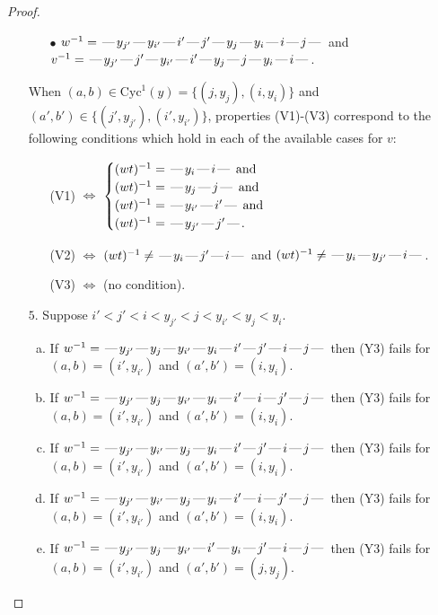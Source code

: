 \documentclass[10pt]{article}
\theoremstyle{definition}
\theoremstyle{definition}
\def\dash{\text{\hspace{0.5mm}---\hspace{0.5mm}}}
\def\Cyc{\mathrm{Cyc}}
\begin{document}
\begin{proof}
\begin{enumerate}
\begin{enumerate}
\item[$\bullet$] $w^{-1} = \dash y_{j'}\dash y_{i'}\dash i'\dash j'\dash y_j\dash y_i\dash i\dash j\dash $ and $v^{-1} = \dash y_{j'}\dash j'\dash y_{i'}\dash i'\dash y_j\dash j\dash y_i\dash i\dash $.
\end{enumerate}
When $(a,b)\in\Cyc^1(y)=\{(j,y_j),(i,y_i)\}$ and $(a',b')\in\{(j',y_{j'}),(i',y_{i'})\}$,
properties (V1)-(V3) correspond to the following conditions which hold in
each of the available cases for $v$:
\begin{enumerate}
\item[](V1) $\Leftrightarrow$ $\begin{cases}\text{$(wt)^{-1} = \dash y_i \dash i \dash$}\text{ and }\\
\text{$(wt)^{-1} = \dash y_j \dash j \dash$}\text{ and }\\
\text{$(wt)^{-1} = \dash y_{i'} \dash i' \dash$}\text{ and }\\
\text{$(wt)^{-1} = \dash y_{j'} \dash j' \dash$}.\end{cases}$
\item[](V2) $\Leftrightarrow$ $(wt)^{-1} \neq \dash y_i \dash j' \dash i \dash$ and $(wt)^{-1}\neq \dash y_i \dash y_{j'} \dash i \dash$.
\item[](V3) $\Leftrightarrow$ (no condition).
\end{enumerate}
\item[$5$.] Suppose $i' < j' < i < y_{j'} < j < y_{i'} < y_j < y_i$.
\begin{enumerate}[(a)]
\item If $w^{-1} = \dash y_{j'}\dash y_j\dash y_{i'}\dash y_i\dash i'\dash j'\dash i\dash j\dash $ then (Y3) fails for $(a,b)=(i',y_{i'})$ and $(a',b')=(i,y_i)$.
\item If $w^{-1} = \dash y_{j'}\dash y_j\dash y_{i'}\dash y_i\dash i'\dash i\dash j'\dash j\dash $ then (Y3) fails for $(a,b)=(i',y_{i'})$ and $(a',b')=(i,y_i)$.
\item If $w^{-1} = \dash y_{j'}\dash y_{i'}\dash y_j\dash y_i\dash i'\dash j'\dash i\dash j\dash $ then (Y3) fails for $(a,b)=(i',y_{i'})$ and $(a',b')=(i,y_i)$.
\item If $w^{-1} = \dash y_{j'}\dash y_{i'}\dash y_j\dash y_i\dash i'\dash i\dash j'\dash j\dash $ then (Y3) fails for $(a,b)=(i',y_{i'})$ and $(a',b')=(i,y_i)$.
\item If $w^{-1} = \dash y_{j'}\dash y_j\dash y_{i'}\dash i'\dash y_i\dash j'\dash i\dash j\dash $ then (Y3) fails for $(a,b)=(i',y_{i'})$ and $(a',b')=(j,y_j)$.

\end{enumerate}
\end{enumerate}
\end{proof}
\end{document}
